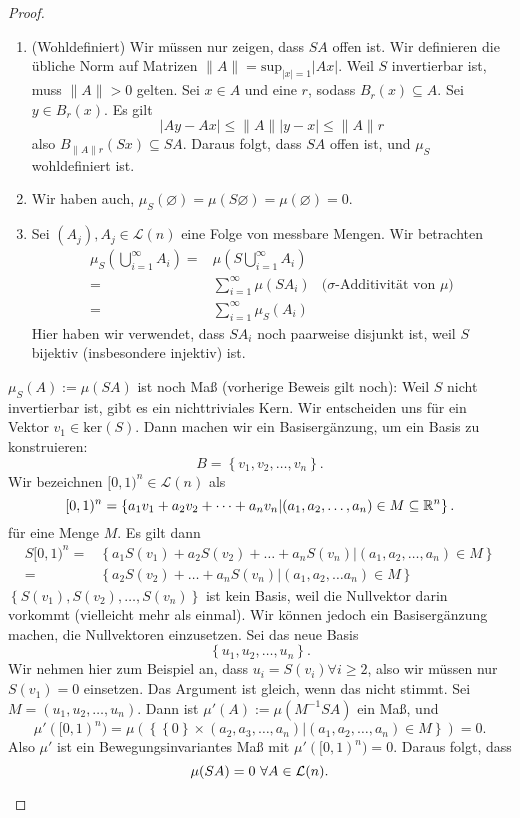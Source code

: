 \begin{proof}
\begin{parts}
\item 
	\begin{enumerate}[label=(\roman*)]
		\item (Wohldefiniert) Wir müssen nur zeigen, dass $SA$ offen ist. Wir definieren die übliche Norm auf Matrizen $\|A\|=\text{sup}_{|x|=1}|Ax|$. Weil $S$ invertierbar ist, muss $\|A\|>0$ gelten. Sei $x\in A$ und eine $r$, sodass $B_r(x)\subseteq A$. Sei $y\in B_r(x)$. Es gilt
			\[
			|Ay-Ax|\le \|A\| |y-x|\le \|A\|r
		\]
		also $B_{\|A\|r}(Sx)\subseteq SA$. Daraus folgt, dass $SA$ offen ist, und $\mu_S$ wohldefiniert ist.
	\item Wir haben auch, $\mu_S(\varnothing)=\mu(S\varnothing)=\mu(\varnothing)=0$.
	\item Sei  $(A_j), A_j\in \mathcal{L}(n)$ eine Folge von messbare Mengen. Wir betrachten
		\begin{align*}
			\mu_S\left(\bigcup_{i=1} ^\infty A_i\right)=&\mu\left( S\bigcup_{i=1}^\infty A_i\right) \\
			=& \sum_{i=1}^{\infty} \mu(SA_i) &(\sigma\text{-Additivität von $\mu$)}\\
			=&  \sum_{i=1}^{\infty} \mu_S(A_i)
		\end{align*}
		Hier haben wir verwendet, dass $SA_i$ noch paarweise disjunkt ist, weil $S$ bijektiv (insbesondere injektiv) ist.
	\end{enumerate}
\item $\mu_S(A):=\mu(SA)$ ist noch Maß (vorherige Beweis gilt noch): Weil $S$ nicht invertierbar ist, gibt es ein nichttriviales Kern. Wir entscheiden uns f\"{u}r ein Vektor $v_1\in \text{ker}(S)$. Dann machen wir ein Basisergänzung, um ein Basis zu konstruieren:
	\[
	B=\left\{ v_1,v_2,\dots, v_n \right\} 
	.\] 
	Wir bezeichnen $[0,1)^n\in \mathcal{L}(n)$ als
	\[
	[0,1)^n=\left\{ a_1v_1+a_2v_2+\dots+a_nv_n|(a_1,a_2,\dots,a_n)\in M\subseteq \mathbb{R}^n \right\} 
	.\] 
	f\"{u}r eine Menge $M$. Es gilt dann
	\begin{align*}
		S[0,1)^n=&\left\{ a_1S(v_1)+a_2S(v_2)+\dots +a_nS(v_n)|(a_1,a_2,\dots, a_n)\in M \right\}\\
		=&\left\{ a_2S(v_2)+\dots+a_nS(v_n)|(a_1,a_2,\dots a_n)\in M \right\} 
\end{align*}
	$\left\{ S(v_1),S(v_2),\dots, S(v_n) \right\}$ ist kein Basis, weil die Nullvektor darin vorkommt (vielleicht mehr als einmal). Wir können jedoch ein Basisergänzung machen, die Nullvektoren einzusetzen. Sei das neue Basis
	\[
	\left\{ u_1,u_2,\dots, u_n \right\} 
	.\] 
	Wir nehmen hier zum Beispiel an, dass $u_i=S(v_i)\forall i\ge 2$, also wir müssen nur $S(v_1)=0$ einsetzen. Das Argument ist gleich, wenn das nicht stimmt. Sei $M=(u_1,u_2,\dots, u_n)$. Dann ist $\mu'(A):=\mu(M^{-1}SA)$ ein Maß, und
	\[
		\mu'([0,1)^n)=\mu(\left\{\left\{ 0 \right\} \times (a_2,a_3,\dots, a_n)|(a_1,a_2,\dots, a_n)\in M\right\})=0
	.\] 
	Also $\mu'$ ist ein Bewegungsinvariantes Maß mit $\mu'([0,1)^n)=0$. Daraus folgt, dass
	\[
	\mu(SA)=0~\forall A\in \mathcal{L}(n)
	.\qedhere\] 
\end{parts}	
\end{proof}
